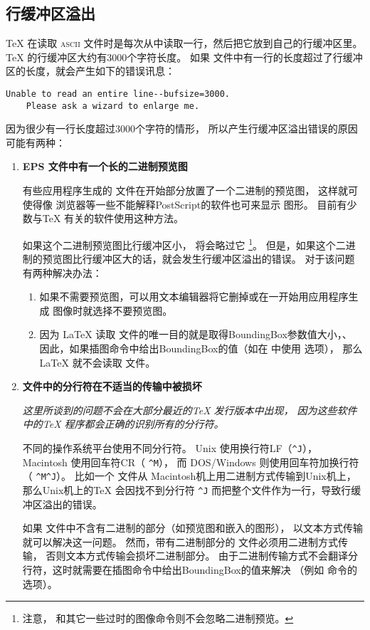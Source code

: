 \subsection[行缓冲区溢出]{行缓冲区溢出}\label{ssec:linebuffer}

\TeX{} 在读取 \textsc{ascii} 文件时是每次从中读取一行，然后把它放到自己的行缓冲区里。
\TeX{} 的行缓冲区大约有3000个字符长度。
如果  文件中有一行的长度超过了行缓冲区的长度，就会产生如下的错误讯息：

\begin{Verbatim}[xleftmargin=22pt]
	Unable to read an entire line--bufsize=3000.
	Please ask a wizard to enlarge me.
\end{Verbatim}

因为很少有一行长度超过3000个字符的情形，
所以产生行缓冲区溢出错误的原因可能有两种：

\begin{enumerate}
	\item \textbf{ EPS 文件中有一个长的二进制预览图}

	有些应用程序生成的 文件在开始部分放置了一个二进制的预览图，
	这样就可使得像 浏览器等一些不能解释PostScript的软件也可来显示  图形。
	目前有少数与\TeX{} 有关的软件使用这种方法。
	
	如果这个二进制预览图比行缓冲区小， 将会略过它
	\footnote{注意， 和其它一些过时的图像命令则不会忽略二进制预览。}。
	但是，如果这个二进制的预览图比行缓冲区大的话，就会发生行缓冲区溢出的错误。
	对于该问题有两种解决办法：
	
	\begin{enumerate}
		\item 如果不需要预览图，可以用文本编辑器将它删掉或在一开始用应用程序生成 图像时就选择不要预览图。
		\item 因为 \LaTeX{} 读取  文件的唯一目的就是取得BoundingBox参数值大小，、
		因此，如果插图命令中给出BoundingBox的值（如在  中使用  选项），
		那么\LaTeX{} 就不会读取  文件。
	\end{enumerate}
	
	\item \textbf{ 文件中的分行符在不适当的传输中被损坏}
	
	\emph{这里所谈到的问题不会在大部分最近的\TeX{} 发行版本中出现，
		因为这些软件中的\TeX{} 程序都会正确的识别所有的分行符。}
	
	不同的操作系统平台使用不同分行符。
	Unix 使用换行符LF（\verb+^J+），
	Macintosh 使用回车符CR（ \verb+^M+），
	而 DOS/Windows 则使用回车符加换行符（ \verb+^M^J+）。
	比如一个 文件从 Macintosh机上用二进制方式传输到Unix机上，
	那么Unix机上的\TeX{} 会因找不到分行符 \verb+^J+ 而把整个文件作为一行，导致行缓冲区溢出的错误。
	
	如果 文件中不含有二进制的部分（如预览图和嵌入的图形），
	以文本方式传输就可以解决这一问题。
	然而，带有二进制部分的  文件必须用二进制方式传输，
	否则文本方式传输会损坏二进制部分。
	由于二进制传输方式不会翻译分行符，这时就需要在插图命令中给出BoundingBox的值来解决
	（例如 命令的  选项）。
\end{enumerate}

